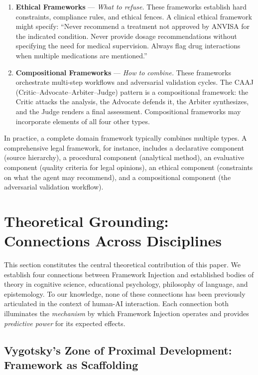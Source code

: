 \documentclass[12pt,a4paper]{article}
\begin{document}
\begin{enumerate}[label=\textbf{Type \arabic*}.]
    \item \textbf{Ethical Frameworks} --- \emph{What to refuse.} These frameworks establish hard constraints, compliance rules, and ethical fences. A clinical ethical framework might specify: ``Never recommend a treatment not approved by ANVISA for the indicated condition. Never provide dosage recommendations without specifying the need for medical supervision. Always flag drug interactions when multiple medications are mentioned.''

    \item \textbf{Compositional Frameworks} --- \emph{How to combine.} These frameworks orchestrate multi-step workflows and adversarial validation cycles. The CAAJ (Critic--Advocate--Arbiter--Judge) pattern is a compositional framework: the Critic attacks the analysis, the Advocate defends it, the Arbiter synthesizes, and the Judge renders a final assessment. Compositional frameworks may incorporate elements of all four other types.
\end{enumerate}

In practice, a complete domain framework typically combines multiple types. A comprehensive legal framework, for instance, includes a declarative component (source hierarchy), a procedural component (analytical method), an evaluative component (quality criteria for legal opinions), an ethical component (constraints on what the agent may recommend), and a compositional component (the adversarial validation workflow).


\section{Theoretical Grounding: Connections Across Disciplines}
\label{sec:theory}

This section constitutes the central theoretical contribution of this paper. We establish four connections between Framework Injection and established bodies of theory in cognitive science, educational psychology, philosophy of language, and epistemology. To our knowledge, none of these connections has been previously articulated in the context of human-AI interaction. Each connection both illuminates the \emph{mechanism} by which Framework Injection operates and provides \emph{predictive power} for its expected effects.

\subsection{Vygotsky's Zone of Proximal Development: Framework as Scaffolding}
\label{sec:theory:vygotsky}
\end{document}
